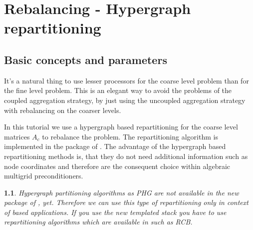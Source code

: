 \documentclass[10pt,fleqn]{book}
\newtheorem*{mycomment}{\ding{42}}
\newcommand\printScreenOutput[1]{

{\vspace{-0.3cm}\hfill\tiny{created with \muelu version }}
}
\begin{document}

\chapter{Rebalancing - Hypergraph repartitioning}

\section{Basic concepts and parameters}
It's a natural thing to use lesser processors for the coarse level problem than for the fine level problem. This is an elegant way to avoid the problems of the coupled aggregation strategy, by just using the uncoupled aggregation strategy with rebalancing on the coarser levels.

In this tutorial we use a hypergraph based repartitioning for the coarse level matrices $A_c$ to rebalance the problem. The repartitioning algorithm is implemented in the \zoltan package of \trilinos. The advantage of the hypergraph based repartitioning methods is, that they do not need additional information such as node coordinates and therefore are the consequent choice within algebraic multigrid preconditioners.

\begin{mycomment}
Hypergraph partitioning algorithms as PHG are not available in the new \zoltantwo package of \trilinos, yet. Therefore we can use this type of repartitioning only in context of \epetra based applications. If you use the new templated \tpetra stack you have to use repartitioning algorithms which are available in \zoltantwo such as RCB.
\end{mycomment}
\end{document}

